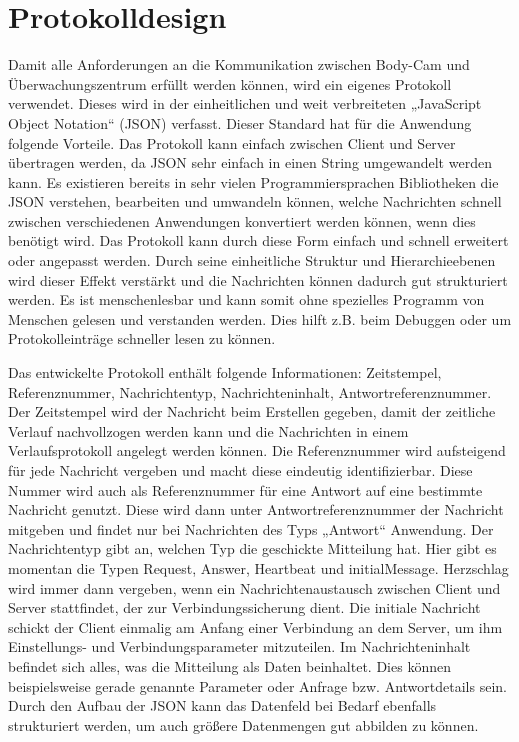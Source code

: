 \documentclass[thesis.tex]{subfiles}
\begin{document}
\section{Protokolldesign}\label{chap:protokolldesign}
Damit alle Anforderungen an die Kommunikation zwischen Body-Cam und Überwachungszentrum erfüllt werden können, wird ein eigenes Protokoll verwendet.
Dieses wird in der einheitlichen und weit verbreiteten „JavaScript Object Notation“ (JSON) verfasst.
Dieser Standard hat für die Anwendung folgende Vorteile.
Das Protokoll kann einfach zwischen Client und Server übertragen werden, da JSON sehr einfach in einen String umgewandelt werden kann.
Es existieren bereits in sehr vielen Programmiersprachen Bibliotheken die JSON verstehen, bearbeiten und umwandeln können, welche Nachrichten schnell zwischen verschiedenen Anwendungen konvertiert werden können, wenn dies benötigt wird.
Das Protokoll kann durch diese Form einfach und schnell erweitert oder angepasst werden.
Durch seine einheitliche Struktur und Hierarchieebenen wird dieser Effekt verstärkt und die Nachrichten können dadurch gut strukturiert werden.
Es ist menschenlesbar und kann somit ohne spezielles Programm von Menschen gelesen und verstanden werden.
Dies hilft z.B. beim Debuggen oder um Protokolleinträge schneller lesen zu können. \cite[]{ecma_404}

Das entwickelte Protokoll enthält folgende Informationen: Zeitstempel, Referenznummer, Nachrichtentyp, Nachrichteninhalt, Antwortreferenznummer.
Der Zeitstempel wird der Nachricht beim Erstellen gegeben, damit der zeitliche Verlauf nachvollzogen werden kann und die Nachrichten in einem Verlaufsprotokoll angelegt werden können.
Die Referenznummer wird aufsteigend für jede Nachricht vergeben und macht diese eindeutig identifizierbar.
Diese Nummer wird auch als Referenznummer für eine Antwort auf eine bestimmte Nachricht genutzt.
Diese wird dann unter Antwortreferenznummer der Nachricht mitgeben und findet nur bei Nachrichten des Typs „Antwort“ Anwendung.
Der Nachrichtentyp gibt an, welchen Typ die geschickte Mitteilung hat.
Hier gibt es momentan die Typen Request, Answer, Heartbeat und initialMessage.
Herzschlag wird immer dann vergeben, wenn ein Nachrichtenaustausch zwischen Client und Server stattfindet, der zur Verbindungssicherung dient.
Die initiale Nachricht schickt der Client einmalig am Anfang einer Verbindung an dem Server, um ihm Einstellungs- und Verbindungsparameter mitzuteilen.
Im Nachrichteninhalt befindet sich alles, was die Mitteilung als Daten beinhaltet.
Dies können beispielsweise gerade genannte Parameter oder Anfrage bzw. Antwortdetails sein.
Durch den Aufbau der JSON kann das Datenfeld bei Bedarf ebenfalls strukturiert werden, um auch größere Datenmengen gut abbilden zu können.
\end{document}
